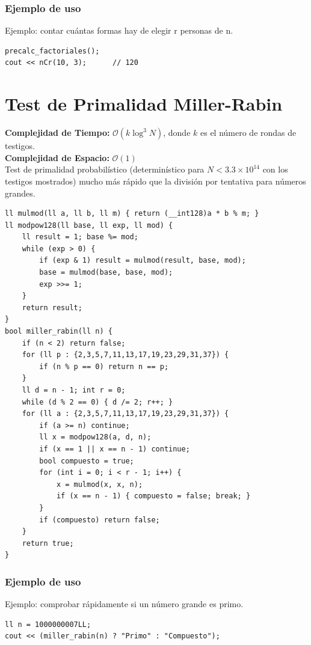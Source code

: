\documentclass[10pt,twocolumn,letterpaper]{report}
\begin{document}
\subsubsection*{Ejemplo de uso}
Ejemplo: contar cuántas formas hay de elegir r personas de n.
\begin{lstlisting}
precalc_factoriales();
cout << nCr(10, 3);      // 120
\end{lstlisting}

\section{Test de Primalidad Miller-Rabin}
\textbf{Complejidad de Tiempo:} $\mathcal{O}(k \log^3 N)$, donde $k$ es el número de rondas de testigos. \\
\textbf{Complejidad de Espacio:} $\mathcal{O}(1)$ \\
Test de primalidad probabilístico (determinístico para $N < 3.3 \times 10^{14}$ con los testigos mostrados) mucho más rápido que la división por tentativa para números grandes.
\begin{lstlisting}
ll mulmod(ll a, ll b, ll m) { return (__int128)a * b % m; }
ll modpow128(ll base, ll exp, ll mod) {
    ll result = 1; base %= mod;
    while (exp > 0) {
        if (exp & 1) result = mulmod(result, base, mod);
        base = mulmod(base, base, mod);
        exp >>= 1;
    }
    return result;
}
bool miller_rabin(ll n) {
    if (n < 2) return false;
    for (ll p : {2,3,5,7,11,13,17,19,23,29,31,37}) {
        if (n % p == 0) return n == p;
    }
    ll d = n - 1; int r = 0;
    while (d % 2 == 0) { d /= 2; r++; }
    for (ll a : {2,3,5,7,11,13,17,19,23,29,31,37}) {
        if (a >= n) continue;
        ll x = modpow128(a, d, n);
        if (x == 1 || x == n - 1) continue;
        bool compuesto = true;
        for (int i = 0; i < r - 1; i++) {
            x = mulmod(x, x, n);
            if (x == n - 1) { compuesto = false; break; }
        }
        if (compuesto) return false;
    }
    return true;
}
\end{lstlisting}
\subsubsection*{Ejemplo de uso}
Ejemplo: comprobar rápidamente si un número grande es primo.
\begin{lstlisting}
ll n = 1000000007LL;
cout << (miller_rabin(n) ? "Primo" : "Compuesto");
\end{lstlisting}
\end{document}
